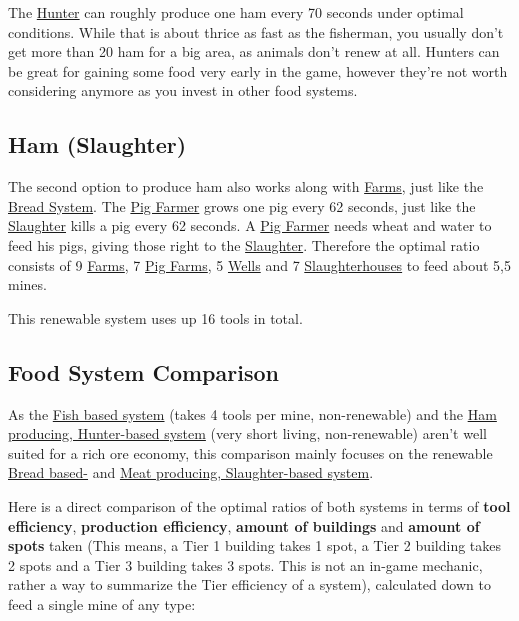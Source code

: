 \documentclass[12pt]{article}
\begin{document}
The  \hyperref[sec:hunter]{Hunter} can roughly produce one ham every 70 seconds under optimal conditions. While that is about thrice as fast as the fisherman, you usually don't get more than 20 ham for a big area, as animals don't renew at all. Hunters can be great for gaining some food very early in the game, however they're not worth considering anymore as you invest in other food systems.

\subsection{Ham (Slaughter)}
\label{sec:hamslaughter}

The second option to produce ham also works along with \hyperref[sec:farm]{Farms}, just like the \hyperref[sec:bread]{Bread System}. The \hyperref[sec:pigfarm]{Pig Farmer} grows one pig every 62 seconds, just like the \hyperref[sec:slaughterhouse]{Slaughter} kills a pig every 62 seconds. A \hyperref[sec:pigfarm]{Pig Farmer} needs wheat and water to feed his pigs, giving those right to the \hyperref[sec:slaughterhouse]{Slaughter}. Therefore the optimal ratio consists of 9 \hyperref[sec:farm]{Farms}, 7 \hyperref[sec:pigfarm]{Pig Farms}, 5 \hyperref[sec:well]{Wells} and 7 \hyperref[sec:slaughterhouse]{Slaughterhouses} to feed about 5,5 mines.

This renewable system uses up 16 tools in total.

\subsection{Food System Comparison}
\label{sec:foodsystemcomparison}

As the \hyperref[sec:fish]{Fish based system} (takes 4 tools per mine, non-renewable) and the \hyperref[sec:hamhunter]{Ham producing, Hunter-based system} (very short living, non-renewable) aren't well suited for a rich ore economy, this comparison mainly focuses on the renewable \hyperref[sec:bread]{Bread based-} and \hyperref[sec:hamslaughter]{Meat producing, Slaughter-based system}.

Here is a direct comparison of the optimal ratios of both systems in terms of \textbf{tool efficiency}, \textbf{production efficiency}, \textbf{amount of buildings} and \textbf{amount of spots} taken (This means, a Tier 1 building takes 1 spot, a Tier 2 building takes 2 spots and a Tier 3 building takes 3 spots. This is not an in-game mechanic, rather a way to summarize the Tier efficiency of a system), calculated down to feed a single mine of any type:
\end{document}
